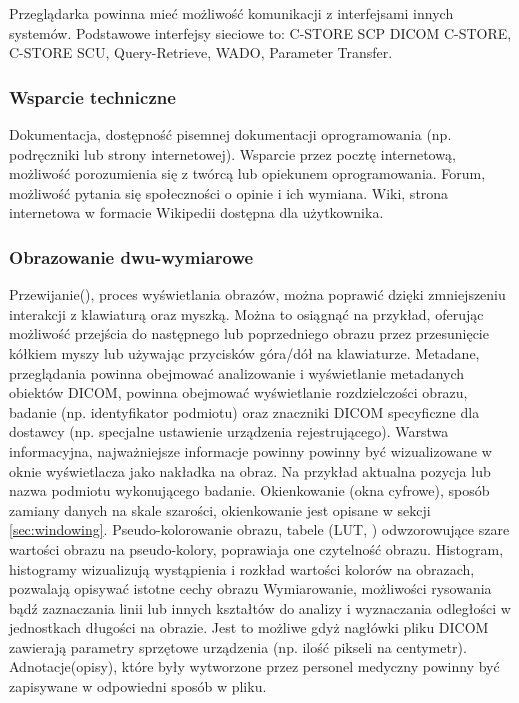 Przeglądarka powinna mieć możliwość komunikacji z interfejsami innych systemów.
Podstawowe interfejsy sieciowe to: C-STORE SCP DICOM C-STORE, C-STORE SCU, Query-Retrieve, WADO, Parameter Transfer.

\subsubsection{Wsparcie techniczne}

Dokumentacja, dostępność pisemnej dokumentacji oprogramowania (np. podręczniki lub strony internetowej).
Wsparcie przez pocztę internetową, możliwość porozumienia się z twórcą lub opiekunem oprogramowania.
Forum, możliwość pytania się społeczności o opinie i ich wymiana.
Wiki, strona internetowa w formacie Wikipedii dostępna dla użytkownika.

\subsubsection{Obrazowanie dwu-wymiarowe}

Przewijanie(), proces wyświetlania obrazów, można poprawić dzięki zmniejszeniu interakcji z klawiaturą oraz myszką. Można to osiągnąć na przykład, oferując możliwość przejścia do następnego lub poprzedniego obrazu przez przesunięcie kółkiem myszy lub używając przycisków góra/dół na klawiaturze.
Metadane, przeglądania powinna obejmować analizowanie i wyświetlanie metadanych obiektów DICOM, powinna obejmować wyświetlanie rozdzielczości obrazu, badanie (np. identyfikator podmiotu) oraz znaczniki DICOM specyficzne dla dostawcy (np. specjalne ustawienie urządzenia rejestrującego).
Warstwa informacyjna, najważniejsze informacje powinny powinny być wizualizowane w oknie wyświetlacza jako nakładka na obraz.
Na przykład aktualna pozycja lub nazwa podmiotu wykonującego badanie.
Okienkowanie (okna cyfrowe), sposób zamiany danych na skale szarości, okienkowanie jest opisane w sekcji \ref{sec:windowing}.
Pseudo-kolorowanie obrazu, tabele (LUT, ) odwzorowujące szare wartości obrazu na pseudo-kolory, poprawiaja one czytelność obrazu.
Histogram, histogramy wizualizują wystąpienia i rozkład wartości kolorów na obrazach, pozwalają opisywać istotne cechy obrazu
Wymiarowanie, możliwości rysowania bądź zaznaczania linii lub innych kształtów do analizy i wyznaczania odległości w jednostkach długości na obrazie.
Jest to możliwe gdyż nagłówki pliku DICOM zawierają parametry sprzętowe urządzenia (np. ilość pikseli na centymetr).
Adnotacje(opisy), które były wytworzone przez personel medyczny powinny być zapisywane w odpowiedni sposób w pliku.

